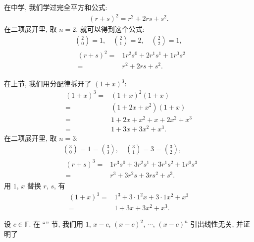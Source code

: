\begin{example}
    在中学, 我们学过完全平方和公式:
    \begin{align*}
        (r + s)^2 = r^2 + 2rs + s^2.
    \end{align*}
    在二项展开里, 取 $n = 2$, 就可以得到这个公式:
    \begin{align*}
         & \binom{2}{0} = 1, \quad \binom{2}{1} = 2, \quad \binom{2}{2} = 1, \\
         & \begin{aligned}
            (r + s)^2
            = {} & 1r^2 s^0 + 2r^1 s^1 + 1r^0 s^2 \\
            = {} & r^2 + 2rs + s^2.
        \end{aligned}
    \end{align*}

    在上节, 我们用分配律拆开了 $(1+x)^3$:
    \begin{align*}
        (1+x)^3
        = {} & (1+x)^2 (1+x)         \\
        = {} & (1+2x+x^2) (1+x)      \\
        = {} & 1+2x+x^2 + x+2x^2+x^3 \\
        = {} & 1+3x+3x^2+x^3.
    \end{align*}
    在二项展开里, 取 $n = 3$:
    \begin{align*}
         & \binom{3}{0} = 1 = \binom{3}{3}, \quad \binom{3}{1} = 3 = \binom{3}{2}, \\
         & \begin{aligned}
            (r+s)^3
            = {} & 1r^3 s^0 + 3r^2 s^1 + 3r^1 s^2 + 1r^0 s^3 \\
            = {} & r^3 + 3r^2 s + 3r s^2 + s^3.
        \end{aligned}
    \end{align*}
    用 $1$, $x$ 替换 $r$, $s$, 有
    \begin{align*}
        (1+x)^3
        = {} & 1^3 + 3 \cdot 1^2 x + 3 \cdot 1 x^2 + x^3 \\
        = {} & 1 + 3x + 3x^2 + x^3.
    \end{align*}
\end{example}

设 $c \in \mathbb{F}$. 在 ``\PolynomialEquality'' 节, 我们用 $1$, $x-c$, $(x-c)^2$, $\cdots$, $(x-c)^n$ 引出线性无关, 并证明了

